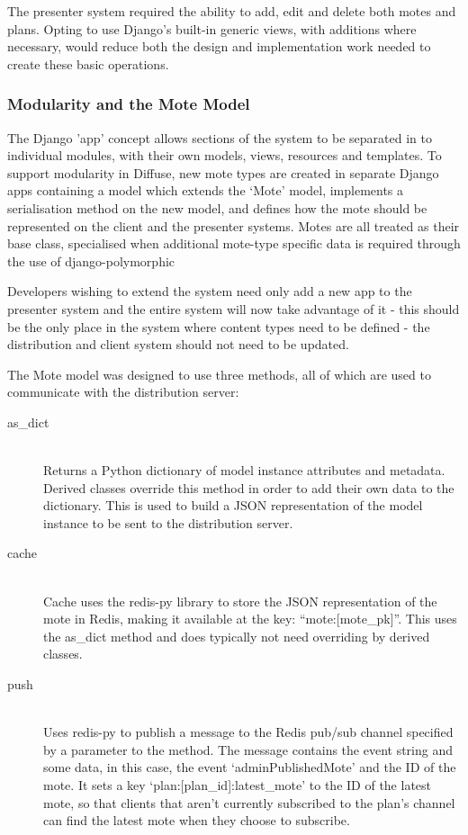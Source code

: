 \documentclass[a4papert,11pt,notitlepage]{article}
\begin{document}
The presenter system required the ability to add, edit and delete both motes and plans. Opting to use Django's built-in generic views, with additions where necessary, would reduce both the design and implementation work needed to create these basic operations.

\subsubsection{Modularity and the Mote Model}
The Django 'app' concept allows sections of the system to be separated in to individual modules, with their own models, views, resources and templates. To support modularity in Diffuse, new mote types are created in separate Django apps containing a model which extends the `Mote' model, implements a serialisation method on the new model, and defines how the mote should be represented on the client and the presenter systems. Motes are all treated as their base class, specialised when additional mote-type specific data is required through the use of django-polymorphic\cite{djangopolymorphic:web}

Developers wishing to extend the system need only add a new app to the presenter system and the entire system will now take advantage of it - this should be the only place in the system where content types need to be defined - the distribution and client system should not need to be updated. 

The Mote model was designed to use three methods, all of which are used to communicate with the distribution server:
\begin{description}
\item[as\_dict] \hfill \\
Returns a Python dictionary of model instance attributes and metadata. Derived classes override this method in order to add their own data to the dictionary. This is used to build a JSON representation of the model instance to be sent to the distribution server.
\item[cache] \hfill \\
Cache uses the redis-py\cite{redispy:web} library to store the JSON representation of the mote in Redis, making it available at the key: ``mote:{[}mote\_pk{]}''. This uses the as\_dict method and does typically not need overriding by derived classes.
\item[push] \hfill \\
Uses redis-py to publish a message to the Redis pub/sub channel specified by a parameter to the method. The message contains the event string and some data, in this case, the event `adminPublishedMote' and the ID of the mote. It   sets a key `plan:{[}plan\_id{]}:latest\_mote' to the ID of the latest mote, so that clients that aren't currently subscribed to the plan's channel can find the latest mote when they choose to subscribe.
\end{description}
\end{document}
